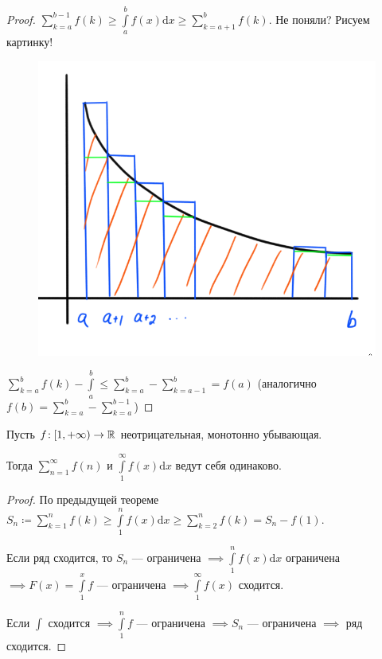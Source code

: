 \begin{proof}
     $\sum\limits_{k=a}^{b-1} f(k) \ge \int\limits_a^b f(x)\mathrm{d}x \ge \sum\limits_{k=a+1}^b f(k)$. Не поняли? Рисуем картинку!
     \begin{figure}[!h]
         \includegraphics[scale=0.3]{integrals_and_sums}
     \end{figure}
    
    $\sum\limits_{k=a}^b f(k) - \int\limits_a^b \le \sum\limits_{k=a}^b - \sum\limits_{k=a-1}^b = f(a)$ (аналогично $f(b) = \sum\limits_{k=a}^b - \sum\limits_{k=a}^{b-1}$)

\end{proof}
\begin{theorem}
    Пусть $f\!:[1, +\infty) \to \mathbb{R}$ неотрицательная, монотонно убывающая. 

    Тогда  $\sum\limits_{n=1}^\infty f(n)$ и  $\int\limits_1^\infty f(x) \mathrm{d}x$ ведут себя одинаково.
\end{theorem}
\begin{proof}
    По предыдущей теореме $S_n \coloneqq \sum\limits_{k=1}^n f(k) \ge \int\limits_1^n f(x)\mathrm{d}x \ge \sum\limits_{k=2}^n f(k) = S_n - f(1)$.

    Если ряд сходится, то $S_n$ --- ограничена  $\implies \int\limits_1^n f(x)\mathrm{d}x$ ограничена $\implies F(x) = \int\limits_1^x f$ --- ограничена $\implies \int\limits_1^\infty f(x)$ сходится.

    Если  $\int$ сходится $\implies \int\limits_1^n f$ --- ограничена  $\implies S_n$ --- ограничена  $\implies$ ряд сходится.
\end{proof}
